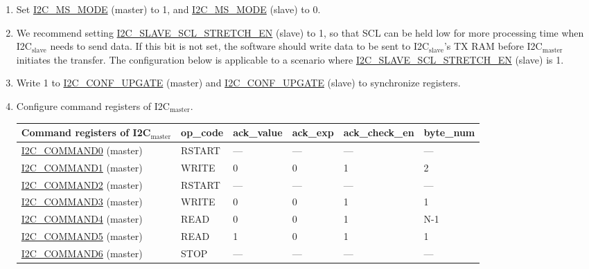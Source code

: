 \documentclass[main\_\_EN.tex]{subfiles}
\begin{document}
\begin{enumerate}
\item Set \hyperref[fielddesc:I2CMSMODE]{I2C\_MS\_MODE} (master) to 1, and \hyperref[fielddesc:I2CMSMODE]{I2C\_MS\_MODE} (slave) to 0.
\item We recommend setting \hyperref[fielddesc:I2CSLAVESCLSTRETCHEN]{I2C\_SLAVE\_SCL\_STRETCH\_EN} (slave) to 1, so that SCL can be held low for more processing time when I2C$_\text{slave}$ needs to send data. If this bit is not set, the software should write data to be sent to I2C$_\text{slave}$'s TX RAM before I2C$_\text{master}$ initiates the transfer. The configuration below is applicable to a scenario where \hyperref[fielddesc:I2CSLAVESCLSTRETCHEN]{I2C\_SLAVE\_SCL\_STRETCH\_EN} (slave) is 1.
\item Write 1 to \hyperref[fielddesc:I2CCONFUPGATE]{I2C\_CONF\_UPGATE} (master) and \hyperref[fielddesc:I2CCONFUPGATE]{I2C\_CONF\_UPGATE} (slave) to synchronize registers.
\item Configure command registers of I2C$_\text{master}$.

\begin{longtable}{ | p{5cm} | p{1.5cm} | p{1.5cm} | p{1.5cm} |p{2.5cm} | p{1.5cm} |}
\hline\rowcolor{lightgray}
Command registers of I2C$_\text{master}$& op\_code & ack\_value&ack\_exp&ack\_check\_en&byte\_num  \\ \hline
\hyperref[fielddesc:I2CCOMMAND0]{I2C\_COMMAND0} (master)& RSTART& ---&---&---&---  \\ \hline
\hyperref[fielddesc:I2CCOMMAND1]{I2C\_COMMAND1} (master)& WRITE& 0&0&1&2  \\ \hline
\hyperref[fielddesc:I2CCOMMAND2]{I2C\_COMMAND2} (master)& RSTART& ---&---&---&---  \\ \hline
\hyperref[fielddesc:I2CCOMMAND3]{I2C\_COMMAND3} (master)& WRITE& 0&0&1&1  \\ \hline
\hyperref[fielddesc:I2CCOMMAND4]{I2C\_COMMAND4} (master)& READ& 0&0&1&N-1  \\ \hline
\hyperref[fielddesc:I2CCOMMAND5]{I2C\_COMMAND5} (master)& READ& 1&0&1&1  \\ \hline
\hyperref[fielddesc:I2CCOMMAND6]{I2C\_COMMAND6} (master)& STOP& ---&---&---&---  \\ \hline
\end{longtable}


\end{enumerate}
\end{document}
